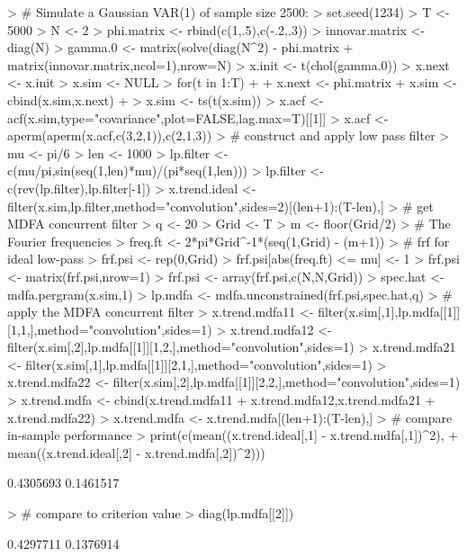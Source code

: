 \documentclass[a4paper]{book}
\begin{document}
\begin{Schunk}
\begin{Sinput}
> # Simulate a Gaussian VAR(1) of sample size 2500:
> set.seed(1234)
> T <- 5000
> N <- 2
> phi.matrix <- rbind(c(1,.5),c(-.2,.3))
> innovar.matrix <- diag(N)
> gamma.0 <- matrix(solve(diag(N^2) - phi.matrix %
+ 	matrix(innovar.matrix,ncol=1),nrow=N)
> x.init <- t(chol(gamma.0)) %
> x.next <- x.init
> x.sim <- NULL
> for(t in 1:T)
+ {
+ 	x.next <- phi.matrix %
+ 	x.sim <- cbind(x.sim,x.next)
+ }
> x.sim <- ts(t(x.sim))
> x.acf <- acf(x.sim,type="covariance",plot=FALSE,lag.max=T)[[1]]
> x.acf <- aperm(aperm(x.acf,c(3,2,1)),c(2,1,3))
> # construct and apply low pass filter
> mu <- pi/6
> len <- 1000
> lp.filter <- c(mu/pi,sin(seq(1,len)*mu)/(pi*seq(1,len)))
> lp.filter <- c(rev(lp.filter),lp.filter[-1])
> x.trend.ideal <- filter(x.sim,lp.filter,method="convolution",sides=2)[(len+1):(T-len),]
> # get MDFA concurrent filter
> q <- 20
> Grid <- T
> m <- floor(Grid/2)
> # The Fourier frequencies
> freq.ft <- 2*pi*Grid^{-1}*(seq(1,Grid) - (m+1))
> # frf for ideal low-pass
> frf.psi <- rep(0,Grid)
> frf.psi[abs(freq.ft) <= mu] <- 1
> frf.psi <- matrix(frf.psi,nrow=1) %
> frf.psi <- array(frf.psi,c(N,N,Grid))
> spec.hat <- mdfa.pergram(x.sim,1)	
> lp.mdfa <- mdfa.unconstrained(frf.psi,spec.hat,q)
> # apply the MDFA concurrent filter
> x.trend.mdfa11 <- filter(x.sim[,1],lp.mdfa[[1]][1,1,],method="convolution",sides=1)
> x.trend.mdfa12 <- filter(x.sim[,2],lp.mdfa[[1]][1,2,],method="convolution",sides=1)
> x.trend.mdfa21 <- filter(x.sim[,1],lp.mdfa[[1]][2,1,],method="convolution",sides=1)
> x.trend.mdfa22 <- filter(x.sim[,2],lp.mdfa[[1]][2,2,],method="convolution",sides=1)
> x.trend.mdfa <- cbind(x.trend.mdfa11 + x.trend.mdfa12,x.trend.mdfa21 + x.trend.mdfa22)
> x.trend.mdfa <- x.trend.mdfa[(len+1):(T-len),] 
> # compare in-sample performance
> print(c(mean((x.trend.ideal[,1] - x.trend.mdfa[,1])^2),
+ 	mean((x.trend.ideal[,2] - x.trend.mdfa[,2])^2)))
\end{Sinput}
\begin{Soutput}
[1] 0.4305693 0.1461517
\end{Soutput}
\begin{Sinput}
> # compare to criterion value
> diag(lp.mdfa[[2]])
\end{Sinput}
\begin{Soutput}
[1] 0.4297711 0.1376914
\end{Soutput}
\end{Schunk}
\end{document}
